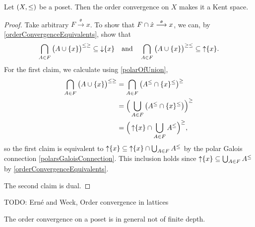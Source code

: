 \begin{proposition}
Let $\sSet{X,\leq}$ be a poset. Then the order convergence on $X$ makes it a Kent space.
\end{proposition}
\begin{proof}
Take arbitrary $F \overset{\mathfrak{o}}{\longrightarrow} x$.
To show that $F\cap \dot{x}\overset{\mathfrak{o}}{\longrightarrow} x$, we can, by \ref{orderConvergenceEquivalents}, show that
\[ \bigcap_{A\in F}\big(A\cup \{x\}\big)^{\leq\geq} \subseteq \operatorname{\downarrow}\{x\} \quad\text{and}\quad \bigcap_{A\in F}\big(A\cup \{x\}\big)^{\geq\leq} \subseteq \operatorname{\uparrow}\{x\}. \]
For the first claim, we calculate using \ref{polarOfUnion},
\begin{align*}
\bigcap_{A\in F}\big(A\cup \{x\}\big)^{\leq\geq} &= \bigcap_{A\in F}\big(A^\leq \cap \{x\}^\leq\big)^{\geq} \\
&= \Big(\bigcup_{A\in F}\big(A^\leq \cap \{x\}^\leq\big)\Big)^{\geq} \\
&= \Big(\operatorname{\uparrow} \{x\} \cap \bigcup_{A\in F}A^\leq \Big)^{\geq},
\end{align*}
so the first claim is equivalent to $\operatorname{\uparrow} \{x\} \subseteq \operatorname{\uparrow} \{x\} \cap \bigcup_{A\in F}A^\leq$ by the polar Galois connection \ref{polarsGaloisConnection}. This inclusion holds since $\operatorname{\uparrow} \{x\} \subseteq \bigcup_{A\in F}A^\leq$ by \ref{orderConvergenceEquivalents}.

The second claim is dual.
\end{proof}

TODO: Erné and Weck, Order convergence in lattices

\begin{example}
The order convergence on a poset is in general not of finite depth.
\end{example}


